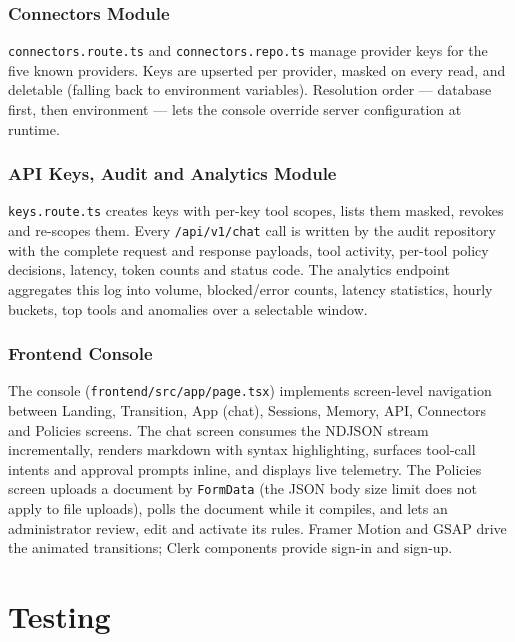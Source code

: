 \documentclass[12pt,a4paper,oneside]{report}
\begin{document}
\subsection{Connectors Module}
\texttt{connectors.route.ts} and \texttt{connectors.repo.ts} manage
provider keys for the five known providers. Keys are upserted per
provider, masked on every read, and deletable (falling back to
environment variables). Resolution order --- database first, then
environment --- lets the console override server configuration at
runtime.

\subsection{API Keys, Audit and Analytics Module}
\texttt{keys.route.ts} creates keys with per-key tool scopes, lists
them masked, revokes and re-scopes them. Every \texttt{/api/v1/chat}
call is written by the audit repository with the complete request and
response payloads, tool activity, per-tool policy decisions, latency,
token counts and status code. The analytics endpoint aggregates this
log into volume, blocked/error counts, latency statistics, hourly
buckets, top tools and anomalies over a selectable window.

\subsection{Frontend Console}
The console (\texttt{frontend/src/app/page.tsx}) implements
screen-level navigation between Landing, Transition, App (chat),
Sessions, Memory, API, Connectors and Policies screens. The chat
screen consumes the NDJSON stream incrementally, renders markdown with
syntax highlighting, surfaces tool-call intents and approval prompts
inline, and displays live telemetry. The Policies screen uploads a
document by \texttt{FormData} (the JSON body size limit does not apply
to file uploads), polls the document while it compiles, and lets an
administrator review, edit and activate its rules. Framer Motion and
GSAP drive the animated transitions; Clerk components provide sign-in
and sign-up.

\chapter{Testing}
\end{document}
